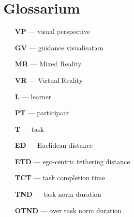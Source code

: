 \chapter{Glossarium}
\begin{itemize}
	\item[\textbf{VP}] --- visual perspective
	\item[\textbf{GV}] --- guidance visualisation 
	\item[\textbf{MR}] --- Mixed Reality
	\item[\textbf{VR}] --- Virtual Reality 
	\item[\textbf{L}] --- learner
	\item[\textbf{PT}] --- participant
	\item[\textbf{T}] --- task
	\item[\textbf{ED}] --- Euclidean distance
	\item[\textbf{ETD}] --- ego-centric tethering distance
	\item[\textbf{TCT}] --- task completion time
	\item[\textbf{TND}] --- task norm duration
	\item[\textbf{OTND}] --- over task norm duration
\end{itemize}